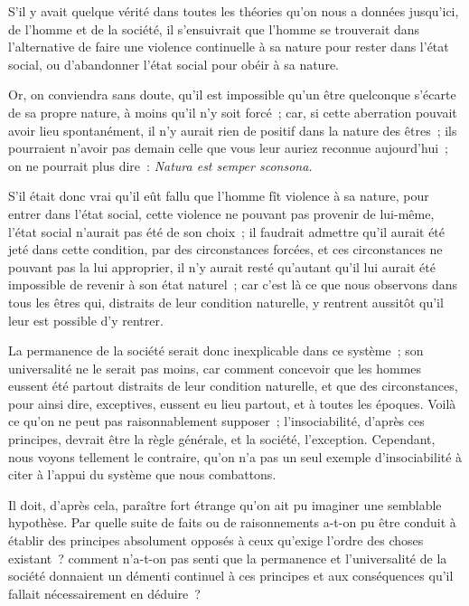 \documentclass[french,twoside]{book} %
\newcommand\chaptercont{} %
\begin{document}
\chaptercont
\noindent S’il y avait quelque vérité dans toutes les théories qu’on nous a données jusqu’ici, de l’homme et de la société, il s’ensuivrait que l’homme se trouverait dans l’alternative de faire une violence continuelle à sa nature pour rester dans l’état social, ou d’abandonner l’état social pour obéir à sa nature.\par
Or, on conviendra sans doute, qu’il est impossible qu’un être quelconque s’écarte de sa propre nature, à moins qu’il n’y soit forcé ; car, si cette aberration pouvait avoir lieu spontanément, il n’y aurait rien de positif dans la nature des êtres ; ils pourraient n’avoir pas demain celle que vous leur auriez reconnue aujourd’hui ; on ne pourrait plus dire : {\itshape Natura est semper sconsona.}\par
S’il était donc vrai qu’il eût fallu que l’homme fît violence à sa nature, pour entrer dans l’état social, cette violence ne pouvant pas provenir de lui-même, l’état social n’aurait pas été de son choix ; il faudrait admettre qu’il aurait été jeté dans cette condition, par des circonstances forcées, et ces circonstances ne pouvant pas la lui approprier, il n’y aurait resté qu’autant qu’il lui aurait été impossible de revenir à son état naturel ; car c’est là ce que nous observons dans tous les êtres qui, distraits de leur condition naturelle, y rentrent aussitôt qu’il leur est possible d’y rentrer.\par
La permanence de la société serait donc inexplicable dans ce système ; son universalité ne le serait pas moins, car comment concevoir que les hommes eussent été partout distraits de leur condition naturelle, et que des circonstances, pour ainsi dire, exceptives, eussent eu lieu partout, et à toutes les époques. Voilà ce qu’on ne peut pas raisonnablement supposer ; l’insociabilité, d’après ces principes, devrait être la règle générale, et la société, l’exception. Cependant, nous voyons tellement le contraire, qu’on n’a pas un seul exemple d’insociabilité à citer à l’appui du système que nous combattons.\par
Il doit, d’après cela, paraître fort étrange qu’on ait pu imaginer une semblable hypothèse. Par quelle suite de faits ou de raisonnements a-t-on pu être conduit à établir des principes absolument opposés à ceux qu’exige l’ordre des choses existant ? comment n’a-t-on pas senti que la permanence et l’universalité de la société donnaient un démenti continuel à ces principes et aux conséquences qu’il fallait nécessairement en déduire ?\par
\end{document}
